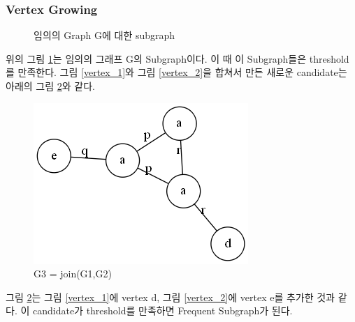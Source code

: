 \documentclass{oblivoir}
\begin{document}
			\subsubsection{Vertex Growing}
				\begin{figure}[h]
					\centering
					\quad %
					\caption{임의의 Graph G에 대한 subgraph}
					\label{vertex}
				\end{figure}
			
				위의 그림 \ref {vertex}는 임의의 그래프 G의 Subgraph이다. 이 때 이  Subgraph들은 threshold를 만족한다. 그림 \ref{vertex_1}와 그림 \ref{vertex_2}을 합쳐서 만든 새로운 candidate는 아래의 그림 \ref{vertex_3}와 같다.
				
			\newpage
				
				\begin{figure}[h]
					\centering
					\includegraphics[width=.4\linewidth]{figure/vertex.3}
					\caption{G3 = join(G1,G2)}
					\label{vertex_3}
				\end{figure}
				
				
				그림 \ref{vertex_3}는 그림 \ref {vertex_1}에 vertex d, 그림 \ref {vertex_2}에 vertex e를 추가한 것과 같다. 이 candidate가 threshold를 만족하면 Frequent Subgraph가 된다.				
				
\end{document}
